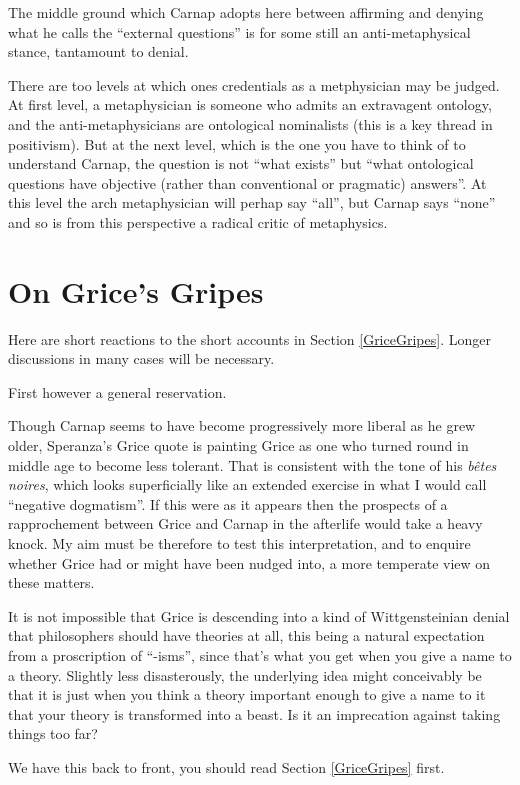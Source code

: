 \documentclass[10pt,titlepage]{book}
\begin{document}
The middle ground which Carnap adopts here between affirming and denying what he calls the ``external questions'' is for some still an anti-metaphysical stance, tantamount to denial.

There are too levels at which ones credentials as a metphysician may be judged.
At first level, a metaphysician is someone who admits an extravagent ontology, and the anti-metaphysicians are ontological nominalists (this is a key thread in positivism).
But at the next level, which is the one you have to think of to understand Carnap, the question is not ``what exists'' but ``what ontological questions have objective (rather than conventional or pragmatic) answers''.
At this level the arch metaphysician will perhap say ``all'', but Carnap says ``none'' and so is from this perspective a radical critic of metaphysics.

\section{On Grice's Gripes}

Here are short reactions to the short accounts in Section \ref{GriceGripes}.
Longer discussions in many cases will be necessary.

First however a general reservation.

Though Carnap seems to have become progressively more liberal as he grew older, Speranza's Grice quote is painting Grice as one who turned round in middle age to become less tolerant.
That is consistent with the tone of his {\it b\^etes noires}, which looks superficially like an extended exercise in what I would call ``negative dogmatism''.
If this were as it appears then the prospects of a rapprochement between Grice and Carnap in the afterlife would take a heavy knock.
My aim must be therefore to test this interpretation, and to enquire whether Grice had or might have been nudged into, a more temperate view on these matters. 

It is not impossible that Grice is descending into a kind of Wittgensteinian denial that philosophers should have theories at all, this being a natural expectation from a proscription of ``-isms'', since that's what you get when you give a name to a theory.
Slightly less disasterously, the underlying idea might conceivably be that it is just when you think a theory important enough to give a name to it that your theory is transformed into a beast.
Is it an imprecation against taking things too far?

We have this back to front, you should read Section \ref{GriceGripes} first.
\end{document}
